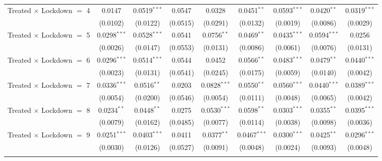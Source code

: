 \begin{tabular}{lcccccccc}
   Treated $\times$ Lockdown $=$ 4   & 0.0147         & 0.0519$^{***}$ & 0.0547        & 0.0328         & 0.0451$^{**}$  & 0.0593$^{***}$ & 0.0420$^{**}$  & 0.0319$^{***}$\\   
                                     & (0.0102)       & (0.0122)       & (0.0515)      & (0.0291)       & (0.0132)       & (0.0019)       & (0.0086)       & (0.0029)\\   
   Treated $\times$ Lockdown $=$ 5   & 0.0298$^{***}$ & 0.0528$^{***}$ & 0.0541        & 0.0756$^{**}$  & 0.0469$^{**}$  & 0.0435$^{***}$ & 0.0594$^{***}$ & 0.0256\\   
                                     & (0.0026)       & (0.0147)       & (0.0553)      & (0.0131)       & (0.0086)       & (0.0061)       & (0.0076)       & (0.0131)\\   
   Treated $\times$ Lockdown $=$ 6   & 0.0296$^{***}$ & 0.0514$^{***}$ & 0.0544        & 0.0452         & 0.0566$^{**}$  & 0.0483$^{***}$ & 0.0479$^{**}$  & 0.0440$^{***}$\\   
                                     & (0.0023)       & (0.0131)       & (0.0541)      & (0.0245)       & (0.0175)       & (0.0059)       & (0.0140)       & (0.0042)\\   
   Treated $\times$ Lockdown $=$ 7   & 0.0336$^{***}$ & 0.0516$^{**}$  & 0.0203        & 0.0828$^{***}$ & 0.0550$^{**}$  & 0.0560$^{***}$ & 0.0440$^{***}$ & 0.0389$^{***}$\\   
                                     & (0.0054)       & (0.0200)       & (0.0546)      & (0.0054)       & (0.0111)       & (0.0048)       & (0.0065)       & (0.0042)\\   
   Treated $\times$ Lockdown $=$ 8   & 0.0234$^{**}$  & 0.0448$^{**}$  & 0.0275        & 0.0530$^{***}$ & 0.0598$^{**}$  & 0.0303$^{***}$ & 0.0355$^{**}$  & 0.0395$^{***}$\\   
                                     & (0.0079)       & (0.0162)       & (0.0485)      & (0.0077)       & (0.0114)       & (0.0038)       & (0.0098)       & (0.0036)\\   
   Treated $\times$ Lockdown $=$ 9   & 0.0251$^{***}$ & 0.0403$^{***}$ & 0.0411        & 0.0377$^{**}$  & 0.0467$^{***}$ & 0.0300$^{***}$ & 0.0425$^{**}$  & 0.0296$^{***}$\\   
                                     & (0.0030)       & (0.0126)       & (0.0527)      & (0.0091)       & (0.0048)       & (0.0024)       & (0.0093)       & (0.0048)\\   
    \\

\end{tabular}
